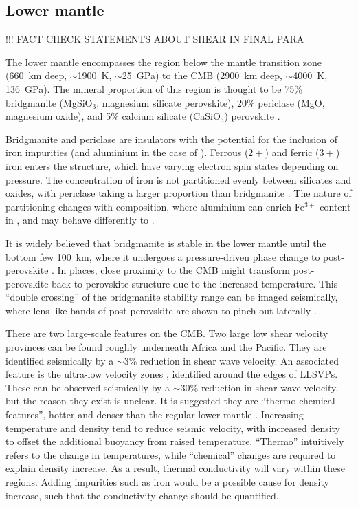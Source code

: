\subsection{Lower mantle}

!!! FACT CHECK STATEMENTS ABOUT SHEAR IN FINAL PARA

The lower mantle encompasses the region below the mantle transition zone (660~km deep, $\sim$1900~K, $\sim$25~GPa) to the CMB (2900~km deep, $\sim$4000~K, 136~GPa). The mineral proportion of this region is thought to be 75\% bridgmanite (MgSiO$_3$, magnesium silicate perovskite), 20\% periclase (MgO, magnesium oxide), and  5\% calcium silicate (CaSiO$_3$) perovskite \citep[][see Figure ~\ref{fig:tronnes_perid_comp}]{Lee2004,Tronnes2009}. 

Bridgmanite and periclase are insulators with the potential for the inclusion of iron impurities (and aluminium in the case of \bdg). Ferrous ($2+$) and ferric ($3+$) iron enters the \bdgs structure, which have varying electron spin states depending on pressure. The concentration of iron is not partitioned evenly between silicates and oxides, with periclase taking a larger proportion than bridgmanite \citep{Muir2016}. The nature of partitioning changes with composition, where aluminium can enrich Fe$^{3+}$ content in \bdgs \citep{McCammon1997}, and \ppvs may behave differently to \bdg.

It is widely believed that bridgmanite is stable in the lower mantle until the bottom few 100~km, where it undergoes a pressure-driven phase change to post-perovskite \citep{Murakami2004,Oganov2004}. In places, close proximity to the CMB might transform post-perovskite back to perovskite structure due to the increased temperature. This ``double crossing'' of the bridgmanite stability range can be imaged seismically, where lens-like bands of post-perovskite are shown to pinch out laterally \citep{Lay2006}.

There are two large-scale features on the CMB. Two large low shear velocity provinces \citep[LLSVPs, see][]{Garnero2008} can be found roughly underneath Africa and the Pacific. They are identified seismically by a $\sim$3\% reduction in shear wave velocity. An associated feature is the ultra-low velocity zones \citep[ULVZs, see][]{Rost2005}, identified around the edges of LLSVPs. These can be observed seismically by a $\sim$30\% reduction in shear wave velocity, but the reason they exist is unclear. It is suggested they are ``thermo-chemical features'', hotter and denser than the regular lower mantle \citep{Garnero2008}. Increasing temperature and density tend to reduce seismic velocity, with increased density to offset the additional buoyancy from raised temperature. ``Thermo'' intuitively refers to the change in temperatures, while ``chemical'' changes are required to explain density increase. As a result, thermal conductivity will vary within these regions. Adding impurities such as iron would be a possible cause for density increase, such that the conductivity change should be quantified.

